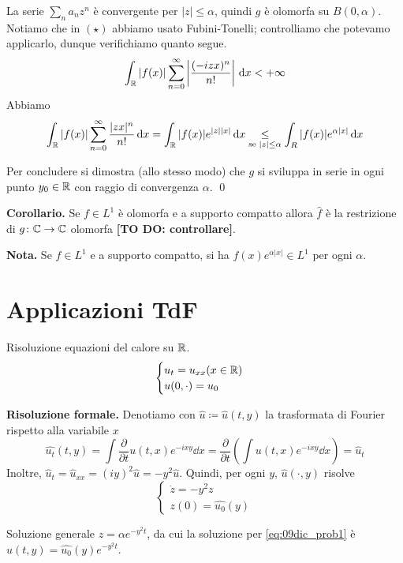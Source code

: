 La serie $\sum_n a_n z^n$ è convergente per $|z| \leq \alpha$, quindi $g$ è olomorfa su $B(0,\alpha)$.
Notiamo che in $(\star)$ abbiamo usato Fubini-Tonelli; controlliamo che potevamo applicarlo, dunque verifichiamo quanto segue.
%
$$
	\int_{\mathbb R} |f(x)| \sum_{n=0}^{\infty} \left| \frac{(-izx)^n}{n!} \right| \,\mathrm{d} x < + \infty
$$
%
Abbiamo
%
$$
	\int_\mathbb R |f(x)| \sum_{n=0}^{\infty} \frac{|zx|^n}{n!} \,\mathrm{d} x
	= \int_\mathbb R |f(x)| e^{|z| |x|} \,\mathrm{d} x
	\underset{\text{se } |z| \leq \alpha}{\leq} \int_R |f(x)| e^{\alpha |x|} \,\mathrm{d} x
$$
%

Per concludere si dimostra (allo stesso modo) che $g$ si sviluppa in serie in ogni punto $y_0 \in \mathbb R$ con raggio di convergenza $\alpha$.
\qed

\vs

\textbf{Corollario.} Se $f \in L^1$ è olomorfa e a supporto compatto allora $\hat{f}$ è la restrizione di $g \colon \mathbb C \to \mathbb C$ olomorfa \textbf{[TO DO: controllare]}.

\textbf{Nota.} Se $f \in L^1$ e a supporto compatto, si ha $f(x) e^{\alpha |x|} \in L^1$ per ogni $\alpha$.

\section{Applicazioni TdF}

Risoluzione equazioni del calore su $\mathbb R$.
%
$$
\begin{cases}
u_t = u_{xx} (x \in \mathbb R) \\
u(0,\cdot) = u_0
\end{cases} 
$$
%

\textbf{Risoluzione formale.}
Denotiamo con $\hat{u} \coloneqq \hat{u}(t,y)$ la trasformata di Fourier rispetto alla variabile $x$ 
%
$$
\hat{u_t}(t,y) = \int \frac{\partial}{\partial t} u(t,x) e^{-ixy} \dd x 
	= \frac{\partial}{\partial t} \left( \int u(t,x) e^{-ixy} \dd x \right) = \hat{u}_t
$$
%
Inoltre, $\hat{u}_t = \hat{u}_{xx} = (iy)^2 \hat{u} = -y^2\hat{u}$.
Quindi, per ogni $y$, $\hat{u}(\cdot,y)$ risolve
%
\begin{equation}
\label{eq:09dic_prob1}\tag{P}
\begin{cases}
	\dot z = -y^2 z \\
	z(0) = \hat{u_0}(y)
\end{cases} 
\end{equation}

Soluzione generale $z = \alpha e^{-y^2 t}$, da cui la soluzione per \eqref{eq:09dic_prob1} è $\hat{u}(t,y) = \hat{u_0}(y) e^{-y^2 t}$.

